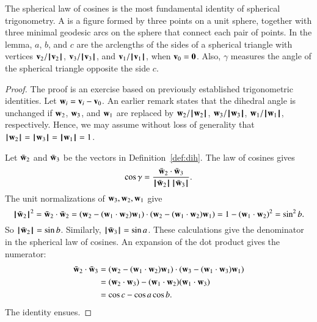 \begin{remark}
  The spherical law of cosines is the most fundamental identity of
  spherical trigonometry.  A  is a figure
  formed by three points on a unit sphere, together with three minimal
  geodesic arcs on the sphere that connect each pair of points.  In
  the lemma, $a$, $b$, and $c$ are the arclengths of the sides of a
  spherical triangle with vertices $\v_2/\normo{\v_2}$,
  $\v_3/\normo{\v_3}$, and $\v_1/\normo{\v_1}$, when $\v_0=\orz$.
  Also, $\gamma$ measures the angle of the spherical triangle opposite
  the side $c$.  %
\end{remark}


\begin{proof} The proof is an exercise based on previously established
  trigonometric identities.  Let $\w_i = \v_i-\v_0$.  An earlier
  remark states that the dihedral angle is
  unchanged if $\w_2$, $\w_3$, and $\w_1$ are replaced by
  $\w_2/\normo{\w_2}$, $\w_3/\normo{\w_3}$, $\w_1/\normo{\w_1}$,
  respectively.  Hence, we may assume without loss of generality that
  $\normo{\w_2}=\normo{\w_3}=\normo{\w_1}=1$.

Let $\bar \w_2$ and $\bar \w_3$ be the vectors in Definition~\ref{def:dih}.
The law of cosines gives
\[ \cos\gamma = \frac{\bar \w_2\cdot \bar \w_3}
{\normo{\bar \w_2}\,\normo{\bar \w_3}}.
\] 
The unit normalizations of $\w_3,\w_2,\w_1$ give
\[ 
\normo{\bar \w_2}^2 = \bar \w_2\cdot \bar \w_2 =
(\w_2 - (\w_1\cdot \w_2)\w_1)\cdot (\w_2 - (\w_1\cdot \w_2) \w_1) =
1 - (\w_1\cdot \w_2)^2 = \sin^2 b.
\] 
So $\normo{\bar \w_2} =\sin b$. Similarly, $\normo{\bar \w_3} = \sin a$.
These calculations give the denominator in the spherical law of cosines.  An
expansion of the dot product gives the numerator:
\begin{align*}
\bar \w_2\cdot \bar \w_3 &=
 (\w_2 - (\w_1\cdot \w_2) \w_1)\cdot (\w_3 - (\w_1\cdot \w_3) \w_1)\\
&= (\w_2\cdot \w_3) - (\w_1\cdot \w_2) (\w_1\cdot \w_3) \\
&= \cos c - \cos a \cos b.
\end{align*}
The identity ensues.
\end{proof}

